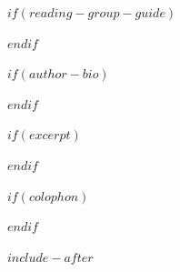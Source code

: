 $if(reading-group-guide)$


\clearpage{\thispagestyle{empty}\cleardoublepage}
$endif$


$if(author-bio)$


\clearpage{\thispagestyle{empty}\cleardoublepage}
$endif$


$if(excerpt)$


\clearpage{\thispagestyle{empty}\cleardoublepage}
$endif$


$if(colophon)$


\clearpage
$endif$

$include-after$

 
 